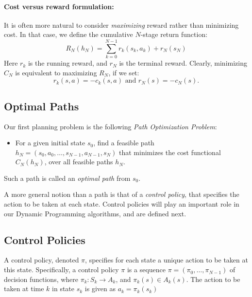 \paragraph{Cost versus reward formulation: }It is often more natural to consider \emph{maximizing} reward rather than minimizing cost.  In that case, we define the cumulative $N$-stage return function:
$${R_N}({h_N}) = \sum\limits_{k = 0}^{N - 1} {{r_k}({s_k},{a_k}) + {r_N}({s_N})} $$
Here ${r_k}$ is the running reward, and ${r_N}$ is the terminal reward.
Clearly, minimizing ${C_N}$ is equivalent to maximizing ${R_N}$, if we set:
$${r_k}(s,a) =  - {c_k}(s,a) \text{ and }{r_N}(s) =  - {c_N}(s).$$


\subsection{Optimal Paths}

Our first planning problem is the following \emph{Path Optimization Problem}:
\begin{itemize}
  \item For a given initial state ${s_0}$, find a feasible path ${h_N} = ({s_0},{a_0}, \ldots ,{s_{N - 1}},{a_{N - 1}},{s_N})$ that minimizes the cost functional ${C_N}({h_N})$, over all feasible paths ${h_N}$.
\end{itemize}

Such a path is called an \emph{optimal path} from ${s_0}$.

A more general notion than a path is that of a \emph{control policy}, that specifies the action to be taken at each state. Control policies will play an important role in our Dynamic Programming algorithms, and are defined next.

\subsection{Control Policies}

\begin{definition} A control policy, denoted $\pi $, specifies for each state a unique action to be taken at this state. Specifically, a control policy  $\pi $ is a sequence $\pi  = ({\pi _0}, \ldots ,{\pi _{N - 1}})$ of decision functions, where
${\pi _k}:{S_k} \to {A_k}$,    and  ${\pi _k}(s) \in {A_k}(s)$.
The action to be taken at time $k$ in state ${s_k}$ is given as
${a_k} = {\pi _k}({s_k})$
\end{definition}


